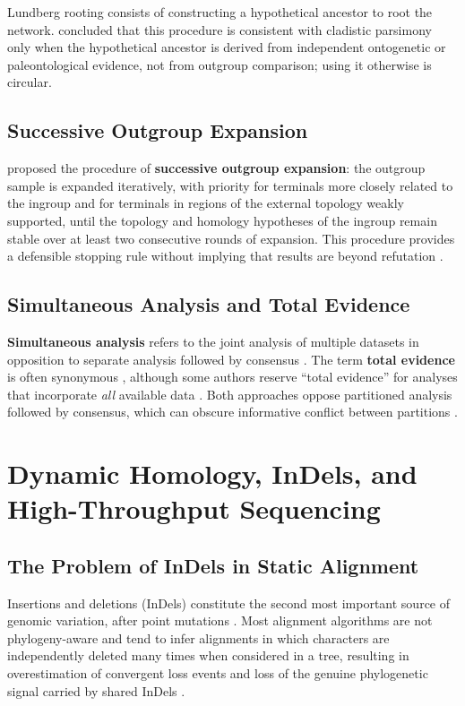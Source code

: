 Lundberg rooting consists of constructing a hypothetical ancestor to root the network. \textcite{nixon1993} concluded that this procedure is consistent with cladistic parsimony only when the hypothetical ancestor is derived from independent ontogenetic or paleontological evidence, not from outgroup comparison; using it otherwise is circular.

\subsection{Successive Outgroup Expansion}

\textcite{grant2019} proposed the procedure of \textbf{successive outgroup expansion}: the outgroup sample is expanded iteratively, with priority for terminals more closely related to the ingroup and for terminals in regions of the external topology weakly supported, until the topology and homology hypotheses of the ingroup remain stable over at least two consecutive rounds of expansion. This procedure provides a defensible stopping rule without implying that results are beyond refutation \parencite{grant2019}.

\subsection{Simultaneous Analysis and Total Evidence}

\textbf{Simultaneous analysis} refers to the joint analysis of multiple datasets in opposition to separate analysis followed by consensus \parencite{nixon1996}. The term \textbf{total evidence} is often synonymous \parencite{kluge1989}, although some authors reserve ``total evidence'' for analyses that incorporate \emph{all} available data \parencite{kluge1989,nixon1996}. Both approaches oppose partitioned analysis followed by consensus, which can obscure informative conflict between partitions \parencite{grantkluge2003}.

\section{Dynamic Homology, InDels, and High-Throughput Sequencing}
\label{sec:dinamica}

\subsection{The Problem of InDels in Static Alignment}

Insertions and deletions (InDels) constitute the second most important source of genomic variation, after point mutations \parencite{redelings2024}. Most alignment algorithms are not phylogeny-aware and tend to infer alignments in which characters are independently deleted many times when considered in a tree, resulting in overestimation of convergent loss events and loss of the genuine phylogenetic signal carried by shared InDels \parencite{redelings2024}.

